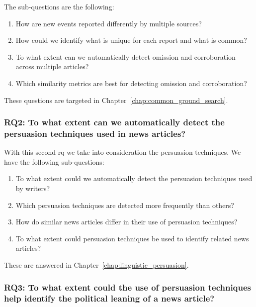 The sub-questions are the following:
\begin{enumerate}[label={\textbf{RQ1.\arabic*:}},leftmargin=2cm]
    \item How are new events reported differently by multiple sources?
    \item How could we identify what is unique for each report and what is common? 
    \item To what extent can we automatically detect omission and corroboration across multiple articles?
    \item Which similarity metrics are best for detecting omission and corroboration?
\end{enumerate}

These questions are targeted in Chapter~\ref{chap:common_ground_search}.

\subsubsection*{RQ2: To what extent can we automatically detect the persuasion techniques used in news articles?}

With this second \acrlong{rq} we take into consideration the persuasion techniques. We have the following sub-questions:

\begin{enumerate}[label={\textbf{RQ2.\arabic*:}},leftmargin=2cm]
    \item To what extent could we automatically detect the persuasion techniques used by writers?
    \item Which persuasion techniques are detected more frequently than others?
    \item How do similar news articles differ in their use of persuasion techniques?
    \item To what extent could persuasion techniques be used to identify related news articles?
\end{enumerate}

These are answered in Chapter~\ref{chap:linguistic_persuasion}.

\subsubsection*{RQ3: To what extent could the use of persuasion techniques help identify the political leaning of a news article?}

